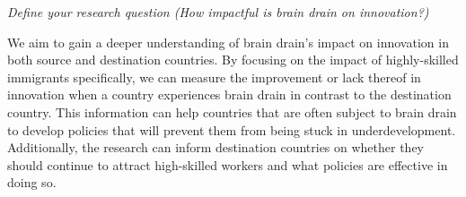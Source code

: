 \documentclass[12pt]{article}
\newcommand{\pointer}[1]{{\color{red} \center \textit{#1}}}
\begin{document}
\pointer{Define your research question (How impactful is brain drain on innovation?)}


We aim to gain a deeper understanding of brain drain's impact on innovation in both source and destination countries. By focusing on the impact of highly-skilled immigrants specifically, we can measure the improvement or lack thereof in innovation when a country experiences brain drain in contrast to the destination country. This information can help countries that are often subject to brain drain to develop policies that will prevent them from being stuck in underdevelopment. Additionally, the research can inform destination countries on whether they should continue to attract high-skilled workers and what policies are effective in doing so.


\end{document}
